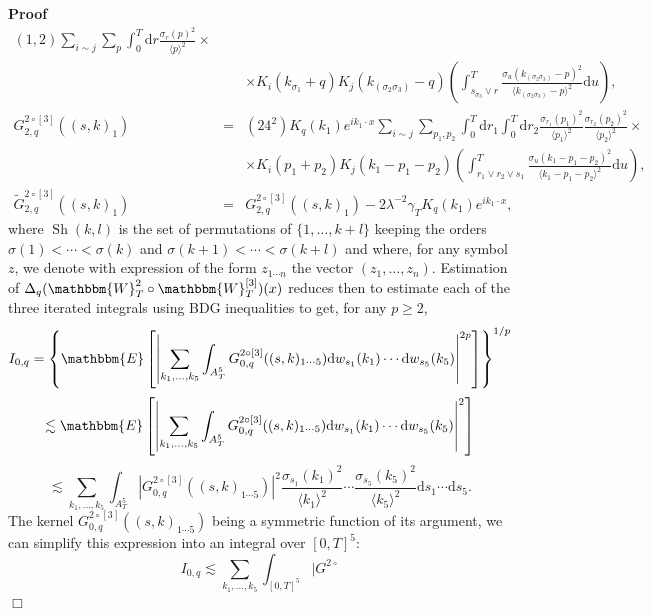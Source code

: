 \documentclass[11pt, oneside]{article}   	%
\newcommand{\mathd}{\mathrm{d}}
\newcommand{\tmop}[1]{\ensuremath{\operatorname{#1}}}
\newenvironment{proof}{\noindent\textbf{Proof\ }}{\hspace*{\fill}$\Box$\medskip}
\begin{document}
\begin{proof}
\begin{eqnarray*}
{    (1, 2)} \sum_{i \sim j} \sum_p \int_0^T \mathd r \frac{\sigma_r
    (p)^2}{\langle p \rangle^2} \times\\
    &  & \times K_i (k_{\sigma_1} + q) K_j (k_{(\sigma_2 \sigma_3)} - q)
    \left( \int_{s_{\sigma_3} \vee r}^T \frac{\sigma_u (k_{(\sigma_2
    \sigma_3)} - p)^2}{\langle k_{(\sigma_2 \sigma_3)} - p \rangle^2} \mathd u
    \right),\\
    G^{2 \circ [3]}_{2, q} ((s, k)_1) & = & (24^2) K_q (k_1) e^{i k_1 \cdot x}
    \sum_{i \sim j} \sum_{p_1, p_2} \int_0^T \mathd r_1 \int_0^T \mathd r_2
    \frac{\sigma_{r_1} (p_1)^2}{\langle p_1 \rangle^2} \frac{\sigma_{r_2}
    (p_2)^2}{\langle p_2 \rangle^2} \times\\
    &  & \times K_i (p_1 + p_2) K_j (k_1 - p_1 - p_2) \left( \int_{r_1 \vee
    r_2 \vee s_1}^T \frac{\sigma_u (k_1 - p_1 - p_2)^2}{\langle k_1 - p_1 -
    p_2 \rangle^2} \mathd u \right),\\
    \tilde{G}^{2 \circ [3]}_{2, q} ((s, k)_1) & = & G^{2 \circ [3]}_{2, q}
    ((s, k)_1) - 2 \lambda^{- 2} \gamma_T K_q (k_1) e^{i k_1 \cdot x},
  \end{eqnarray*}
  where $\tmop{Sh} (k, l)$ is the set of permutations of $\{ 1, \ldots, k + l
  \}$ keeping the orders $\sigma (1) < \cdots < \sigma (k)$ and $\sigma (k +
  1) < \cdots < \sigma (k + l)$ and where, for any symbol $z$, we denote with
  expression of the form $z_{1 \cdots n}$ the vector $(z_1, \ldots, z_n)$.
  Estimation of $\Delta_q (\mathbbm{W}^2_T \circ \mathbbm{W}^{[3]}_T) (x)$
  reduces then to estimate each of the three iterated integrals using BDG
  inequalities to get, for any $p \geqslant 2$,
  \[ I_{0, q} = \left\{ \mathbbm{E} \left[ \left| \sum_{k_1, \ldots, k_5}
     \int_{A_T^5} G^{2 \circ [3]}_{0, q} ((s, k)_{1 \cdots 5}) \mathd w_{s_1}
     (k_1) \cdots \mathd w_{s_5} (k_5) \right|^{2 p} \right] \right\}^{1 / p}
  \]
  \[ \lesssim \mathbbm{E} \left[ \left| \sum_{k_1, \ldots, k_5} \int_{A_T^5}
     G^{2 \circ [3]}_{0, q} ((s, k)_{1 \cdots 5}) \mathd w_{s_1} (k_1) \cdots
     \mathd w_{s_5} (k_5) \right|^2 \right] \]
  \[ \lesssim \sum_{k_1, \ldots, k_5} \int_{A_T^5} | G^{2 \circ [3]}_{0, q}
     ((s, k)_{1 \cdots 5}) |^2 \frac{\sigma_{s_1} (k_1)^2}{\langle k_1
     \rangle^2} \cdots \frac{\sigma_{s_5} (k_5)^2}{\langle k_5 \rangle^2}
     \mathd s_1 \cdots \mathd s_5 . \]
  The kernel $G^{2 \circ [3]}_{0, q} ((s, k)_{1 \cdots 5})$ being a symmetric
  function of its argument, we can simplify this expression into an integral
  over $[0, T]^5$:
  \[ \  \]
  \[ I_{0, q} \lesssim \sum_{k_1, \ldots, k_5} \int_{[0, T]^5} | G^{2 \circ
}\]
\end{proof}
\end{document}
